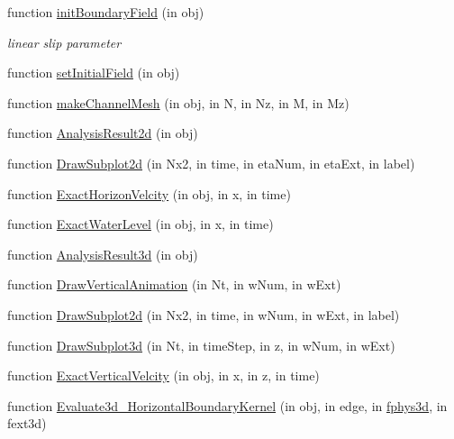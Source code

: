 \begin{DoxyCompactItemize}
\item 
function \hyperlink{class_open_channel3d_a50f37a66a05832ba2fbdc559d1bfb0e4}{init\+Boundary\+Field} (in obj)
\begin{DoxyCompactList}\small\item\em linear slip parameter \end{DoxyCompactList}\item 
function \hyperlink{class_open_channel3d_ac0165752f3793364fda301ed42be4159}{set\+Initial\+Field} (in obj)
\item 
function \hyperlink{class_open_channel3d_a3c385082525c91de9459bbaecb764499}{make\+Channel\+Mesh} (in obj, in N, in Nz, in M, in Mz)
\item 
function \hyperlink{class_open_channel3d_a87aeafd3cfc6ee4685d375e7d58d40d4}{Analysis\+Result2d} (in obj)
\item 
function \hyperlink{class_open_channel3d_ac3ce644bd3c983951205d4b125ac9003}{Draw\+Subplot2d} (in Nx2, in time, in eta\+Num, in eta\+Ext, in label)
\item 
function \hyperlink{class_open_channel3d_a7473e07f895d8d5d28f2295d3c66ed33}{Exact\+Horizon\+Velcity} (in obj, in x, in time)
\item 
function \hyperlink{class_open_channel3d_a163fec5baf004f98317ead032bdc448b}{Exact\+Water\+Level} (in obj, in x, in time)
\item 
function \hyperlink{class_open_channel3d_ab53a8afd34822d6d50baad537d91b8e3}{Analysis\+Result3d} (in obj)
\item 
function \hyperlink{class_open_channel3d_afc1316e9b11d92deefd22c89700ebd4c}{Draw\+Vertical\+Animation} (in Nt, in w\+Num, in w\+Ext)
\item 
function \hyperlink{class_open_channel3d_a106e5f7ded060f32d7b285fc5a462363}{Draw\+Subplot2d} (in Nx2, in time, in w\+Num, in w\+Ext, in label)
\item 
function \hyperlink{class_open_channel3d_a078069fa7a403d2732669514608f0706}{Draw\+Subplot3d} (in Nt, in time\+Step, in z, in w\+Num, in w\+Ext)
\item 
function \hyperlink{class_open_channel3d_a739451cc4812b0283c34c710279b86e9}{Exact\+Vertical\+Velcity} (in obj, in x, in z, in time)
\item 
function \hyperlink{class_open_channel3d_ae08be3624dde2b52536eb6b5328429d5}{Evaluate3d\+\_\+\+Horizontal\+Boundary\+Kernel} (in obj, in edge, in \hyperlink{class_l_s_w_e_abstract3d_a85a25b72732b21d0d624e9f88ed52dc4}{fphys3d}, in fext3d)

\end{DoxyCompactItemize}
